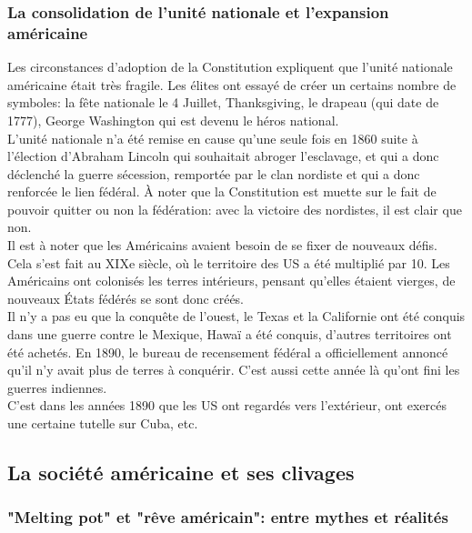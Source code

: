 \documentclass[10pt, a4paper, openany]{book}
\begin{document}
\subsubsection{La consolidation de l'unité nationale et l'expansion américaine}

Les circonstances d'adoption de la Constitution expliquent que l'unité nationale américaine était très fragile. Les élites ont essayé de créer un certains nombre de symboles: la fête nationale le 4 Juillet, Thanksgiving, le drapeau (qui date de 1777), George Washington qui est devenu le héros national. \\
L'unité nationale n'a été remise en cause qu'une seule fois en 1860 suite à l'élection d'Abraham Lincoln qui souhaitait abroger l'esclavage, et qui a donc déclenché la guerre sécession, remportée par le clan nordiste et qui a donc renforcée le lien fédéral. À noter que la Constitution est muette sur le fait de pouvoir quitter ou non la fédération: avec la victoire des nordistes, il est clair que non. \\
Il est à noter que les Américains avaient besoin de se fixer de nouveaux défis. Cela s'est fait au XIXe siècle, où le territoire des US a été multiplié par 10. Les Américains ont colonisés les terres intérieurs, pensant qu'elles étaient vierges, de nouveaux États fédérés se sont donc créés. \\
Il n'y a pas eu que la conquête de l'ouest, le Texas et la Californie ont été conquis dans une guerre contre le Mexique, Hawaï a été conquis, d'autres territoires ont été achetés. En 1890, le bureau de recensement fédéral a officiellement annoncé qu'il n'y avait plus de terres à conquérir. C'est aussi cette année là qu'ont fini les guerres indiennes. \\
C'est dans les années 1890 que les US ont regardés vers l'extérieur, ont exercés une certaine tutelle sur Cuba, etc. 

\subsection{La société américaine et ses clivages}

\subsubsection{"Melting pot" et "rêve américain": entre mythes et réalités}
\end{document}
